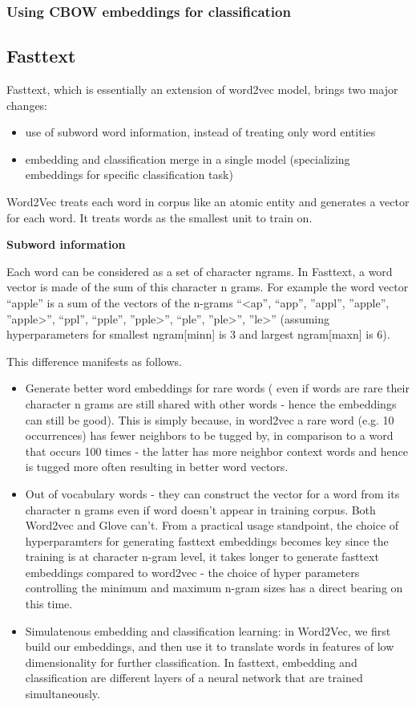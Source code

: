 \subsubsection{Using CBOW embeddings for classification}


\subsection{Fasttext}

Fasttext, which is essentially an extension of word2vec model, brings two major changes:
\begin{itemize}
	\item use of subword word information, instead of treating only word entities
	\item embedding and classification merge in a single model (specializing embeddings for specific classification task)
\end{itemize}

Word2Vec treats each word in corpus like an atomic entity and generates a vector for each word. It treats words as the smallest unit to train on. 

\textbf{Subword information}

Each word can be considered as a set of character ngrams. In Fasttext, a word vector is made of the sum of this character n grams. For example the word vector “apple” is a sum of the vectors of the n-grams “<ap”, “app”, ”appl”, ”apple”, ”apple>”, “ppl”, “pple”, ”pple>”, “ple”, ”ple>”, ”le>” (assuming hyperparameters for smallest ngram[minn] is 3 and largest ngram[maxn] is 6).

This difference manifests as follows.

\begin{itemize}
	\item Generate better word embeddings for rare words ( even if words are rare their character n grams are still shared with other words - hence the embeddings can still be good).
	This is simply because, in word2vec a rare word (e.g. 10 occurrences) has fewer neighbors to be tugged by, in comparison to a word that occurs 100 times - the latter has more neighbor context words and hence is tugged more often resulting in better word vectors.

	\item Out of vocabulary words - they can construct the vector for a word from its character n grams even if word doesn't appear in training corpus. Both Word2vec and Glove can't.
	From a practical usage standpoint, the choice of hyperparamters for generating fasttext embeddings becomes key
	since the training is at character n-gram level, it takes longer to generate fasttext embeddings compared to word2vec - the choice of hyper parameters controlling the minimum and maximum n-gram sizes has a direct bearing on this time.

	\item Simulatenous embedding and classification learning: in Word2Vec, we first build our embeddings, and then use it to translate words in features of low dimensionality for further classification. In fasttext, embedding and classification are different layers of a neural network that are trained simultaneously.
\end{itemize}


